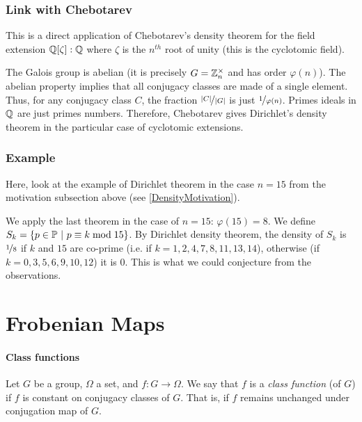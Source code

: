 \subsubsection{Link with Chebotarev}
This is a direct application of Chebotarev's density theorem for the field extension $\mathbb{Q}[\zeta]:\mathbb{Q}$ where $\zeta$ is the $n^{th}$ root of unity (this is the cyclotomic field).

The Galois group is abelian (it is precisely $G=\mathbb{Z}_n^{\times}$ and has order $\varphi(n)$).
The abelian property implies that all conjugacy classes are made of a single element.
Thus, for any conjugacy class $C$, the fraction $\nicefrac{|C|}{|G|}$ is just $\nicefrac{1}{\varphi(n)}$.
Primes ideals in $\mathbb{Q}$ are just primes numbers.
Therefore, Chebotarev gives Dirichlet's density theorem in the particular case of cyclotomic extensions.

\subsubsection{Example}
Here, look at the example of Dirichlet theorem in the case $n=15$ from the motivation subsection above (see \ref{DensityMotivation}).

We apply the last theorem in the case of $n=15$: $\varphi(15)=8$.
We define $S_k = \{ p \in \mathbb{P} \ | \ p \equiv k \bmod 15 \}$.
By Dirichlet density theorem,  the density of $S_k$ is $\nicefrac{1}{8}$ if $k$ and $15$ are co-prime (i.e. if $k = 1,2,4,7,8,11,13,14$), otherwise (if $k=0,3,5,6,9,10,12$) it is $0$.
This is what we could conjecture from the observations.

\section{Frobenian Maps}
\paragraph{Class functions}
Let $G$ be a group, $\Omega$ a set, and $f: G \to \Omega$.
We say that $f$ is a \textit{class function} (of $G$) if $f$ is constant on conjugacy classes of $G$.
That is, if $f$ remains unchanged under conjugation map of $G$.

